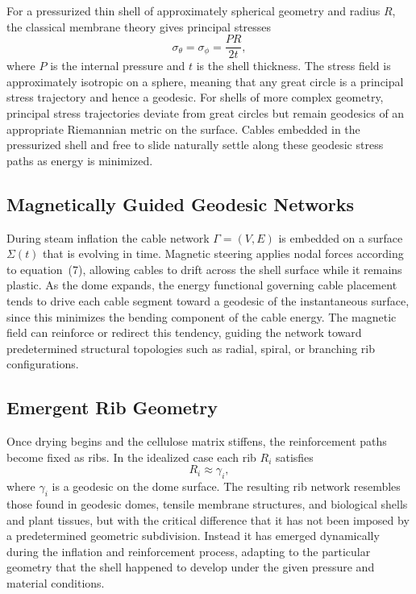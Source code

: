 \documentclass[12pt,a4paper]{article}
\begin{document}
For a pressurized thin shell of approximately spherical geometry and
radius $R$, the classical membrane theory gives principal stresses
\begin{equation}
\sigma_\theta = \sigma_\phi = \frac{PR}{2t},
\end{equation}
where $P$ is the internal pressure and $t$ is the shell thickness. The
stress field is approximately isotropic on a sphere, meaning that any
great circle is a principal stress trajectory and hence a geodesic. For
shells of more complex geometry, principal stress trajectories deviate
from great circles but remain geodesics of an appropriate Riemannian
metric on the surface. Cables embedded in the pressurized shell and
free to slide naturally settle along these geodesic stress paths as
energy is minimized.

\subsection{Magnetically Guided Geodesic Networks}

During steam inflation the cable network $\Gamma = (V,E)$ is embedded
on a surface $\Sigma(t)$ that is evolving in time. Magnetic steering
applies nodal forces according to equation~(7), allowing cables to
drift across the shell surface while it remains plastic. As the dome
expands, the energy functional governing cable placement tends to drive
each cable segment toward a geodesic of the instantaneous surface, since
this minimizes the bending component of the cable energy. The magnetic
field can reinforce or redirect this tendency, guiding the network
toward predetermined structural topologies such as radial, spiral, or
branching rib configurations.

\subsection{Emergent Rib Geometry}

Once drying begins and the cellulose matrix stiffens, the reinforcement
paths become fixed as ribs. In the idealized case each rib $R_i$
satisfies
\begin{equation}
R_i \approx \gamma_i,
\end{equation}
where $\gamma_i$ is a geodesic on the dome surface. The resulting rib
network resembles those found in geodesic domes, tensile membrane
structures, and biological shells and plant tissues, but with the
critical difference that it has not been imposed by a predetermined
geometric subdivision. Instead it has emerged dynamically during the
inflation and reinforcement process, adapting to the particular
geometry that the shell happened to develop under the given pressure
and material conditions.
\end{document}
